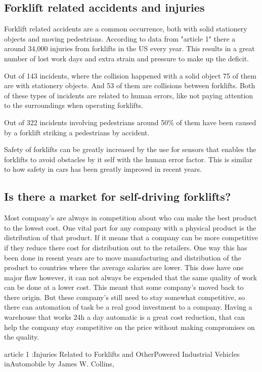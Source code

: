 \documentclass[11pt]{article}
\begin{document}
    \subsection{Forklift related accidents and injuries}
    Forklift related accidents are a common occurrence, both with solid
    stationery objects and moving pedestrians. According to data from "article
    1" there a around 34,000 injuries from forklifts in the US every year. This
    results in a great number of lost work days and extra strain and 
    pressure to make up the deficit.

    Out of 143 incidents, where the collision happened with a solid object
    75 of them are with stationery objects. And 53 of them are collisions 
    between forklifts. Both of these types of incidents are related to 
    human errors, like not paying attention to the surroundings when 
    operating forklifts.

    Out of 322 incidents involving pedestrians around 50\% of them have 
    been caused by a forklift striking a pedestrians by accident.

    Safety of forklifts can be greatly increased by the use for sensors that
    enables the forklifts to avoid obstacles by it self with the human error
    factor. This is similar to how safety in cars has been greatly improved in
    recent years.

    \subsection{Is there a market for self-driving forklifts?}
    Most company's are always in competition about who can make the best
    product to the lowest cost. One vital part for any company with a physical
    product is the distribution of that product. If it means that a company can
    be more competitive if they reduce there cost for distribution out to the
    retailers. One way this has been done in resent years are to move
    manufacturing and distribution of the product to countries where the
    average salaries are lower. This dose have one major flaw however, it can
    not always be expended that the same quality of work can be done at a lower
    cost. This meant that some company's moved back to there origin. But these
    company's still need to stay somewhat competitive, so there can automation
    of task be a real good investment to a company. Having a warehouse that
    works 24h a day automatic is a great cost reduction, that can help the
    company stay competitive on the price without making compromises on the
    quality.    

    article 1 :Injuries Related to Forklifts and OtherPowered Industrial
    Vehicles inAutomobile  by James W. Collins,
\end{document}
